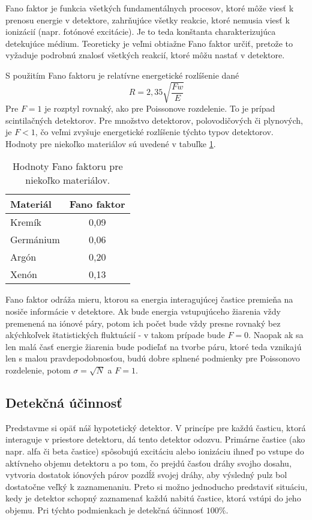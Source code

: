 \documentclass[../../main.tex]{subfiles}
\begin{document}
Fano faktor je funkcia všetkých fundamentálnych procesov, ktoré môže viesť k prenosu energie v detektore, zahrňujúce všetky reakcie, ktoré nemusia viesť k ionizácií (napr. fotónové excitácie). Je to teda konštanta charakterizujúca detekujúce médium. Teoreticky je veľmi obtiažne Fano faktor určiť, pretože to vyžaduje podrobnú znalosť všetkých reakcií, ktoré môžu nastať v detektore.

S použitím Fano faktoru je relatívne energetické rozlíšenie dané
\begin{equation}
R=2,35\sqrt{\dfrac{Fw}{E}}
\end{equation}
Pre $F=1$ je rozptyl rovnaký, ako pre Poissonove rozdelenie. To je prípad scintilačných detektorov. Pre množstvo detektorov, polovodičových či plynových, je $F<1$, čo veľmi zvyšuje energetické rozlíšenie týchto typov detektorov. Hodnoty pre niekoľko materiálov sú uvedené v tabuľke \ref{em4:tab:fano}.

\begin{table}[h]
\centering
\begin{tabular}{l|c}
Materiál & Fano faktor \\ \hline
Kremík & 0,09 \\
Germánium & 0,06 \\
Argón & 0,20 \\
Xenón & 0,13 
\end{tabular}
\caption{Hodnoty Fano faktoru pre niekoľko materiálov.}
\label{em4:tab:fano}
\end{table}

Fano faktor odráža mieru, ktorou sa energia interagujúcej častice premieňa na nosiče informácie v detektore. Ak bude energia vstupujúceho žiarenia vždy premenená na iónové páry, potom ich počet bude vždy presne rovnaký bez akýchkoľvek štatistických fluktuácií - v takom prípade bude $F=0$. Naopak ak sa len malá časť energie žiarenia bude podieľať na tvorbe páru, ktoré teda vznikajú len s malou pravdepodobnosťou, budú dobre splnené podmienky pre Poissonovo rozdelenie, potom $\sigma=\sqrt{N}$ a $F=1$.

\subsection{Detekčná účinnosť}

Predstavme si opäť náš hypotetický detektor. V princípe pre každú časticu, ktorá interaguje v priestore detektoru, dá tento detektor odozvu. Primárne častice (ako napr. alfa či beta častice) spôsobujú excitáciu alebo ionizáciu ihneď po vstupe do aktívneho objemu detektoru a po tom, čo prejdú časťou dráhy svojho dosahu, vytvoria dostatok iónových párov pozdĺž svojej dráhy, aby výsledný pulz bol dostatočne veľký k zaznamenaniu. Preto si možno jednoducho predstaviť situáciu, kedy je detektor schopný zaznamenať každú nabitú častice, ktorá vstúpi do jeho objemu. Pri týchto podmienkach je detekčná účinnosť $100\%$.
\end{document}
